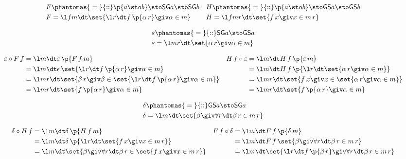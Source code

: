 \documentclass{article}
\newcommand{\SG}[1]{\textsf{SG}#1}
\newcommand{\GS}[1]{\textsf{GS}#1}
\newcommand{\type}{\phantomas{{}={}}{::}}
\begin{document}
\begin{align*}
F &\type \p{a\sto b} \sto \SG{a} \sto \SG{b}
&
H &\type \p{a\sto b} \sto \GS{a} \sto \GS{b}
%
\\
%
F &= \l fm\dt \set{\l r\dt f\,\p{\alpha\,r} \giv \alpha \in m}
&
H &= \l fmr\dt \set{f\,x \giv x\in m\,r}
\end{align*}

\begin{align*}
\varepsilon &\type \SG{a} \sto \GS{a}\\
\varepsilon &= \l mr\dt \set{\alpha\,r \giv \alpha\in m}
\end{align*}

\bigskip

\begin{center}
\end{center}

\bigskip

\begin{align*}
\varepsilon \circ F\,f
&=
\l m\dt \varepsilon\,\p{F\,f\,m}
&
H\,f \circ \varepsilon
&=
\l m\dt H\,f\,\p{\varepsilon\,m}
%
\\
%
&= \l m\dt \epsilon\,\set{\l r\dt f\,\p{\alpha\,r} \giv \alpha\in m}
&
&= \l m\dt H\,f\,\p{\l r\dt \set{\alpha\,r \giv \alpha\in m}}
%
\\
%
&= \l mr\dt \set{\beta\,r \giv \beta\in \set{\l r\dt f\,\p{\alpha\,r} \giv \alpha\in m}}
&
&= \l mr\dt \set{f\,x \giv x \in \set{\alpha\,r \giv \alpha\in m}}
%
\\
%
&= \l mr\dt \set{f\,\p{\alpha\,r} \giv \alpha\in m}
&
&= \l mr\dt \set{f\,\p{\alpha\,r} \giv \alpha\in m}
\end{align*}

\dotfill


\begin{align*}
\delta &\type \GS{a} \sto \SG{a}\\
\delta &= \l m\dt \set{\beta \giv \forall r\dt \beta\,r \in m\,r}
\end{align*}


\begin{align*}
\delta \circ H\,f
&=
\l m\dt \delta\,\p{H\,f\,m}
&
F\,f \circ \delta
&=
\l m\dt F\,f\,\p{\delta\,m}
%
\\
%
&= \l m\dt \delta\,\p{\l r\dt \set{f\,x \giv x\in m\,r}}
&
&= \l m\dt F\,f\,\set{\beta \giv \forall r\dt \beta\,r \in m\,r}
%
\\
%
&= \l m\dt \set{\beta \giv \forall r\dt \beta\,r \in \set{f\,x \giv x\in m\,r}}
&
&= \l m\dt \set{\l r\dt f\,\p{\beta\,r} \giv \forall r\dt \beta\,r\in m\,r}
\end{align*}
\end{document}
